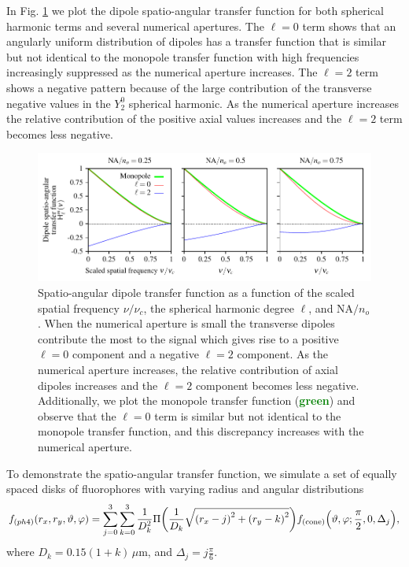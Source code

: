 \documentclass[]{osa-article}
\let\originalleft\left
\let\originalright\right
\renewcommand{\left}{\mathopen{}\mathclose\bgroup\originalleft}
\renewcommand{\right}{\aftergroup\egroup\originalright}
\begin{document}
 In Fig. \ref{fig:dsatf} we plot the dipole spatio-angular transfer function for
 both spherical harmonic terms and several numerical apertures. The $\ell=0$
 term shows that an angularly uniform distribution of dipoles has a transfer
 function that is similar but not identical to the monopole transfer function
 with high frequencies increasingly suppressed as the numerical aperture
 increases. The $\ell=2$ term shows a negative pattern because of the large
 contribution of the transverse negative values in the $Y_2^0$ spherical
 harmonic. As the numerical aperture increases the relative contribution of the
 positive axial values increases and the $\ell=2$ term becomes less negative.
 
\begin{figure}[h]
 \centering
   \centering
   \includegraphics[scale=0.8]{../figures/paratfs/satf.pdf}
   \caption{Spatio-angular dipole transfer function as a function of the scaled
     spatial frequency $\nu/\nu_c$, the spherical harmonic degree $\ell$, and
     $\text{NA}/n_o$. When the numerical aperture is small the transverse
     dipoles contribute the most to the signal which gives rise to a positive
     $\ell=0$ component and a negative $\ell=2$ component. As the numerical
     aperture increases, the relative contribution of axial dipoles increases
     and the $\ell=2$ component becomes less negative. Additionally, we plot the
     monopole transfer function (\textcolor{green}{\textbf{green}}) and observe
     that the $\ell=0$ term is similar but not identical to the monopole
     transfer function, and this discrepancy increases with the numerical aperture.}
   \label{fig:dsatf}
 \end{figure}

 To demonstrate the spatio-angular transfer function, we simulate a set of
 equally spaced disks of fluorophores with varying radius and angular
 distributions
 \begin{align}
   f_{(ph4)}(r_x, r_y, \vartheta, \varphi) = \sum_{j=0}^3 \sum_{k=0}^3 \frac{1}{D_k^2}\Pi\left(\frac{1}{D_k}\sqrt{\left(r_x - j\right)^2 + \left(r_y - k\right)^2}\right)f_{\text{(cone)}}\left(\vartheta, \varphi; \frac{\pi}{2}, 0, \Delta_j\right),\label{eq:phantom4}
 \end{align}
 where $D_k = 0.15(1+k)\, \mu$m, and $\Delta_j = j\frac{\pi}{6}$. 
 
\end{document}
